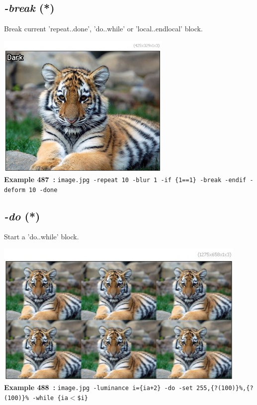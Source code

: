 \documentclass[a4paper,11pt,twoside]{book}
\begin{document}
\subsection{\emph{-break} (*)}\vspace*{-0.5em}
Break current 'repeat..done', 'do..while' or 'local..endlocal' block.
\begin{center}\includegraphics[keepaspectratio=true,height=7cm,width=\textwidth]{img/gmic_def487.jpg}\\
{\footnotesize \textbf{Example 487~:} \texttt{image.jpg -repeat 10 -blur 1 -if \{1==1\} -break -endif -deform 10 -done}}
\end{center}

\subsection{\emph{-do} (*)}\vspace*{-0.5em}
Start a 'do..while' block.
\begin{center}\includegraphics[keepaspectratio=true,height=7cm,width=\textwidth]{img/gmic_def488.jpg}\\
{\footnotesize \textbf{Example 488~:} \texttt{image.jpg -luminance i=\{ia+2\} -do -set 255,\{?(100)\}\%,\{?(100)\}\% -while \{ia$<$\$i\}}}
\end{center}
\end{document}
